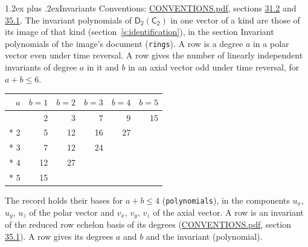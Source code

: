 \documentclass[10pt,a4paper]{article}
\makeatletter
\renewcommand\section{\@startsection{section}{1}{\z@}{-3ex plus -1ex minus -.2ex}%
  {1.2ex plus .2ex}{\normalfont\large\sffamily\bfseries\color{parttitle}}}
\numberwithin{equation}{section}
\newcommand{\grp}[1]{\mathsf{#1}}
\makeatother
\begin{document}
\section{Invariants}\label{s:invariants}
Conventions: \href{../../CONVENTIONS.pdf}{CONVENTIONS.pdf}, sections \href{../../CONVENTIONS.pdf\#conv.31.2}{31.2} and \href{../../CONVENTIONS.pdf\#conv.35.1}{35.1}.
The invariant polynomials of $\grp{D_{2}}(\grp{C_{2}})$ in one vector of a kind are those of its image of that kind (section~\ref{s:identification}), in the section Invariant polynomials of the image's document (\texttt{rings}).
\leavevmode\label{n:index.degree.polar}\label{n:index.degree.axial}A row is a degree $a$ in a polar vector even under time reversal. A row gives the number of linearly independent invariants of degree $a$ in it and $b$ in an axial vector odd under time reversal, for $a + b \le 6$.
{\small\begin{longtable}{@{}rrrrrr@{}}\toprule
$a$ & $b = 1$ & $b = 2$ & $b = 3$ & $b = 4$ & $b = 5$\\\midrule\endhead
\bottomrule\endfoot\endlastfoot
1 & 2 & 3 & 7 & 9 & 15\\*
2 & 5 & 12 & 16 & 27 & \\*
3 & 7 & 12 & 24 &  & \\*
4 & 12 & 27 &  &  & \\*
5 & 15 &  &  &  & \\
\bottomrule\end{longtable}}
\leavevmode\label{n:local.component.polar}\label{n:local.component.axial}The record holds their bases for $a + b \le 4$ (\texttt{polynomials}), in the components $u_{x}$, $u_{y}$, $u_{z}$ of the polar vector and $v_{x}$, $v_{y}$, $v_{z}$ of the axial vector. \label{n:head.polynomial}A row is an invariant of the reduced row echelon basis of its degrees (\href{../../CONVENTIONS.pdf}{CONVENTIONS.pdf}, section \href{../../CONVENTIONS.pdf\#conv.35.1}{35.1}). A row gives its degrees $a$ and $b$ and the invariant (polynomial).
\end{document}
